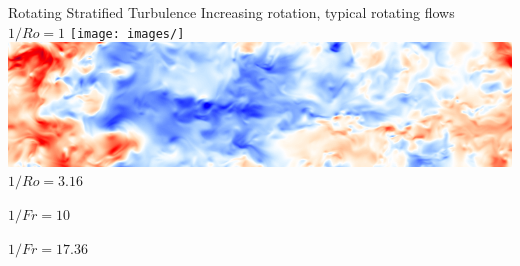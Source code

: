 \documentclass{beamer}
\begin{document}
\begin{frame}{Rotating Stratified Turbulence}
    Increasing rotation, typical rotating flows
        \centering
        $1/Ro = 1$
        \vspace{2pt}
        \texttt{[image: images/]}
        \includegraphics[width=\textwidth]{images/XZB1ux.png}
    \emp
    \hspace{1pt}
        \centering
        $1/Ro = 3.16$
        \vspace{2pt}
        
    \emp
    \hspace{1pt}
        \centering
        $1/Fr = 10$
        \vspace{2pt}
        
    \emp
    \hspace{1pt}
        \centering
        $1/Fr = 17.36$
        \vspace{2pt}
        
    \emp
\end{frame}
\end{document}
